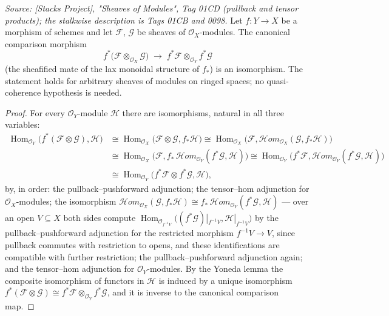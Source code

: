 \begin{lemma}
  \label{lem:pullback_tensor_map_isiso}
  \textit{Source: [Stacks Project], "Sheaves of Modules", Tag 01CD (pullback
  and tensor products); the stalkwise description is Tags 01CB and 0098.}
  Let \(f : Y \to X\) be a morphism of schemes and let \(\mathcal{F}\),
  \(\mathcal{G}\) be sheaves of \(\mathcal{O}_X\)-modules.  The canonical
  comparison morphism
  \[
    f^*\bigl(\mathcal{F} \otimes_{\mathcal{O}_X} \mathcal{G}\bigr)
    \;\longrightarrow\;
    f^*\mathcal{F} \otimes_{\mathcal{O}_Y} f^*\mathcal{G}
  \]
  (the sheafified mate of the lax monoidal structure of \(f_*\)) is an
  isomorphism.  The statement holds for arbitrary sheaves of modules on
  ringed spaces; no quasi-coherence hypothesis is needed.
\end{lemma}
\begin{proof}
  For every \(\mathcal{O}_Y\)-module \(\mathcal{H}\) there are isomorphisms,
  natural in all three variables:
  \begin{align*}
    \operatorname{Hom}_{\mathcal{O}_Y}\!\bigl(f^*(\mathcal{F} \otimes
      \mathcal{G}), \mathcal{H}\bigr)
    &\cong \operatorname{Hom}_{\mathcal{O}_X}\!\bigl(\mathcal{F} \otimes
      \mathcal{G}, f_*\mathcal{H}\bigr)
    \cong \operatorname{Hom}_{\mathcal{O}_X}\!\bigl(\mathcal{F},
      \mathcal{H}om_{\mathcal{O}_X}(\mathcal{G}, f_*\mathcal{H})\bigr) \\
    &\cong \operatorname{Hom}_{\mathcal{O}_X}\!\bigl(\mathcal{F},
      f_*\,\mathcal{H}om_{\mathcal{O}_Y}(f^*\mathcal{G}, \mathcal{H})\bigr)
    \cong \operatorname{Hom}_{\mathcal{O}_Y}\!\bigl(f^*\mathcal{F},
      \mathcal{H}om_{\mathcal{O}_Y}(f^*\mathcal{G}, \mathcal{H})\bigr) \\
    &\cong \operatorname{Hom}_{\mathcal{O}_Y}\!\bigl(f^*\mathcal{F} \otimes
      f^*\mathcal{G}, \mathcal{H}\bigr),
  \end{align*}
  by, in order: the pullback--pushforward adjunction; the tensor--hom
  adjunction for \(\mathcal{O}_X\)-modules; the isomorphism
  \(\mathcal{H}om_{\mathcal{O}_X}(\mathcal{G}, f_*\mathcal{H}) \cong
  f_*\,\mathcal{H}om_{\mathcal{O}_Y}(f^*\mathcal{G}, \mathcal{H})\) — over
  an open \(V \subseteq X\) both sides compute
  \(\operatorname{Hom}_{\mathcal{O}_{f^{-1}V}}\bigl((f^*\mathcal{G})|_{f^{-1}V},
  \mathcal{H}|_{f^{-1}V}\bigr)\) by the pullback--pushforward adjunction for
  the restricted morphism \(f^{-1}V \to V\), since pullback commutes with
  restriction to opens, and these identifications are compatible with
  further restriction; the pullback--pushforward adjunction again; and the
  tensor--hom adjunction for \(\mathcal{O}_Y\)-modules.  By the Yoneda lemma
  the composite isomorphism of functors in \(\mathcal{H}\) is induced by a
  unique isomorphism \(f^*(\mathcal{F} \otimes \mathcal{G}) \cong
  f^*\mathcal{F} \otimes_{\mathcal{O}_Y} f^*\mathcal{G}\), and it is inverse
  to the canonical comparison map.
\end{proof}

